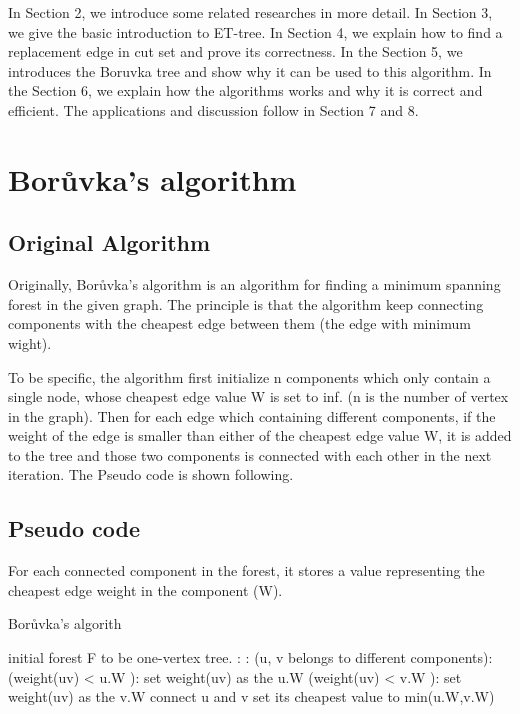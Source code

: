 \documentclass[conference,compsoc]{IEEEtran}
\begin{document}
In Section 2, we introduce some related researches in more detail. In Section 3, we give the basic introduction to ET-tree. In Section 4, we explain how to find a replacement edge in cut set and prove its correctness. In the Section 5, we introduces the Boruvka tree and show why it can be used to this algorithm. In the Section 6, we explain how the algorithms works and why it is correct and efficient. The applications and discussion follow in Section 7 and 8.

\section{Borůvka's algorithm}
\subsection{Original Algorithm}
Originally, Borůvka's algorithm is an algorithm for finding a minimum spanning forest in the given graph. The principle is that the algorithm keep connecting components with the cheapest edge between them (the edge with minimum wight).
\par
To be specific, the algorithm first initialize n components which only contain a single node, whose cheapest edge value W is set to inf. (n is the number of vertex in the graph). Then for each edge which containing different components, if the weight of the edge is smaller than either of the cheapest edge value W, it is added to the tree and those two components is connected with each other in the next iteration. 
The Pseudo code is shown following.

\subsection{Pseudo code}
For each connected component in the forest, it stores a value representing the cheapest edge weight in the component (W).
\begin{algorithm}[H]
\caption{Borůvka's algorith}
\begin{algorithmic}[1]
\State initial forest F to be one-vertex tree.
:
	:
		\If (u, v belongs to different components):
			\If (weight(uv) < u.W ):
				\State set weight(uv) as the u.W
			\EndIf
			\If (weight(uv) < v.W ):
				\State set weight(uv) as the v.W
			\EndIf
		\EndIf
	\EndFor
		\State connect u and v
		\State set its cheapest value to min(u.W,v.W)
	\EndFor
\EndWhile
\end{algorithmic}
\end{algorithm}
\end{document}

